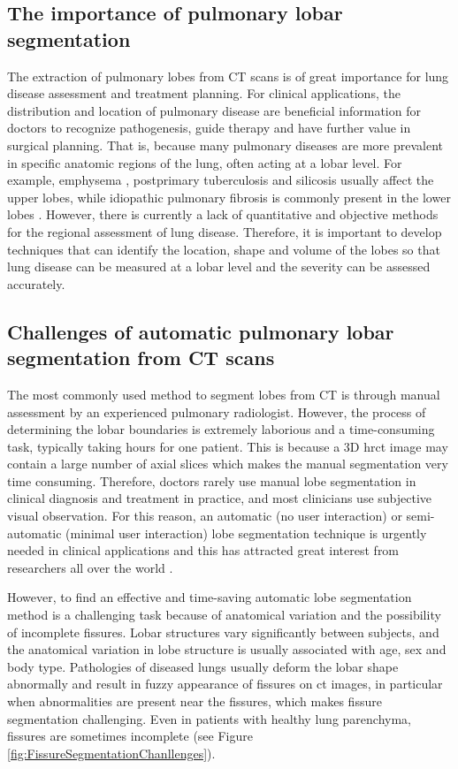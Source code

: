 \subsection{The importance of pulmonary lobar segmentation}
The extraction of pulmonary lobes from CT scans is of great importance for lung disease assessment and treatment planning. For clinical applications, the distribution and location of pulmonary disease are beneficial information for doctors to recognize pathogenesis, guide therapy and have further value in surgical planning. That is, because many pulmonary diseases are more prevalent in specific anatomic regions of the lung, often acting at a lobar level. For example, emphysema \citep{jeffery1998structural}, postprimary tuberculosis \citep{leung1999pulmonary} and silicosis \citep{rees2007silica} usually affect the upper lobes, while idiopathic pulmonary fibrosis is commonly present in the lower lobes \citep{lin2015combined}. However, there is currently a lack of quantitative and objective methods for the regional assessment of lung disease. Therefore, it is important to develop techniques that can identify the location, shape and volume of the lobes so that lung disease can be measured at a lobar level and the severity can be assessed accurately.

\subsection{Challenges of automatic pulmonary lobar segmentation from CT scans} \label{SegmentationChallenge}
The most commonly used method to segment lobes from CT is through manual assessment by an experienced pulmonary radiologist. However, the process of determining the lobar boundaries is extremely laborious and a time-consuming task, typically taking hours for one patient. This is because a 3D \gls{hrct} image may contain a large number of axial slices which makes the manual segmentation very time consuming. Therefore, doctors rarely use manual lobe segmentation in clinical diagnosis and treatment in practice, and most clinicians use subjective visual observation. For this reason, an automatic (no user interaction) or semi-automatic (minimal user interaction) lobe segmentation technique is urgently needed in clinical applications and this has attracted great interest from researchers all over the world \citep{van2013automated,pu2009computational,ukil2009anatomy}.

However, to find an effective and time-saving automatic lobe segmentation method is a challenging task because of anatomical variation and the possibility of incomplete fissures. Lobar structures vary significantly between subjects, and the anatomical variation in lobe structure is usually associated with age, sex and body type. Pathologies of diseased lungs usually deform the lobar shape abnormally and result in fuzzy appearance of fissures on \gls{ct} images, in particular when abnormalities are present near the fissures, which makes fissure segmentation challenging. Even in patients with healthy lung parenchyma, fissures are sometimes incomplete \citep{gulsun2006variability, doel2015review} (see Figure \ref{fig:FissureSegmentationChanllenges}).

